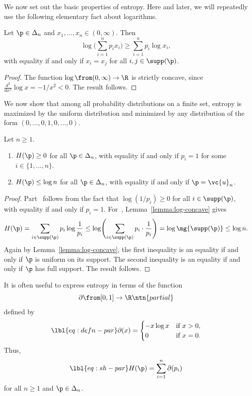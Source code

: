 We now set out the basic properties of entropy.  Here and later, we will
repeatedly use the following elementary fact about logarithms.

\begin{lemma}
Let $\p \in \Delta_n$ and $x_1, \ldots, x_n \in (0, \infty)$.  Then
\[
\log \Biggl( \sum_{i = 1}^n p_i x_i \Biggr)
\geq
\sum_{i = 1}^n p_i \log x_i,
\]
with equality if and only if $x_i = x_j$ for all $i, j \in \supp(\p)$.
\end{lemma}

\begin{proof}
The function $\log \from (0, \infty) \to \R$ is strictly
concave, since 
$\tfrac{d^2}{dx^2} \log x = -1/x^2 < 0$.  The result follows. 
\end{proof}

We now show that among all probability distributions on a finite set,
entropy is maximized by the uniform distribution and minimized by any
distribution of the form $(0, \ldots, 0, 1, 0, \ldots, 0)$.  

\begin{lemma}
Let $n \geq 1$.
% 
\begin{enumerate}
\item 
{}
$H(\p) \geq 0$ for all $\p \in \Delta_n$, with equality if and only if $p_i
  = 1$ for some $i \in \{1, \ldots, n\}$. 

\item
{}
$H(\p) \leq \log n$ for all $\p \in \Delta_n$, with equality if and only if
  $\p = \vc{u}_n$.
\end{enumerate}
\end{lemma}

\begin{proof}
Part~ follows from the fact that $\log(1/p_i) \geq 0$
for all $i \in \supp(\p)$, with equality if and only if $p_i = 1$.
For~, Lemma~\ref{lemma:log-concave} gives
\[
H(\p)
=
\sum_{i \in \supp(\p)} p_i \log \frac{1}{p_i}
\leq
\log \Biggl( \sum_{i \in \supp(\p)} p_i \cdot \frac{1}{p_i} \Biggr)
=
\log\mg{\supp(\p)}
\leq
\log n.
\]
Again by Lemma~\ref{lemma:log-concave}, the first inequality is an equality
if and only if $\p$ is uniform on its support.  The second inequality is an
equality if and only if $\p$ has full support.  The result follows.
\end{proof}

It is often useful to express entropy in terms of the 
function
\[
\partial \from [0, 1] \to \R
\ntn{partial}
\]
defined by
% 
\begin{equation}
\lbl{eq:defn-par}
\partial(x)
=
\begin{cases}
-x \log x       &\text{if } x > 0,      \\
0               &\text{if } x = 0.
\end{cases}
\end{equation}
% 
Thus,
% 
\begin{equation}
\lbl{eq:sh-par}
H(\p) = \sum_{i = 1}^n \partial(p_i)
\end{equation}
% 
for all $n \geq 1$ and $\p \in \Delta_n$.  


